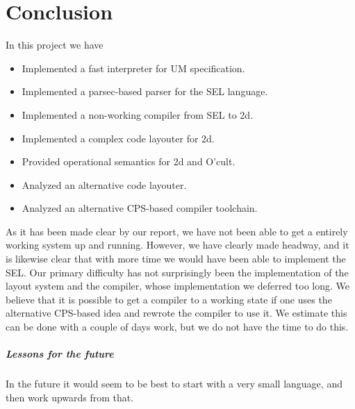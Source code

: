 \chapter*{Conclusion}

In this project we have
\begin{itemize}
\item Implemented a fast interpreter for UM specification.
\item Implemented a parsec-based parser for the SEL language.
\item Implemented a non-working compiler from SEL to 2d.
\item Implemented a complex code layouter for 2d.
\item Provided operational semantics for 2d and O'cult.
\item Analyzed an alternative code layouter.
\item Analyzed an alternative CPS-based compiler toolchain.
\end{itemize}

As it has been made clear by our report, we have not been able to get
a entirely working system up and running. However, we have clearly
made headway, and it is likewise clear that with more time we would
have been able to implement the SEL. Our primary difficulty has not surprisingly been the implementation of the layout system and the
compiler, whose implementation we deferred too long. We believe that
it is possible to get a compiler to a working state if one uses the
alternative CPS-based idea and rewrote the compiler to use it. We
estimate this can be done with a couple of days work, but we do not
have the time to do this.

\paragraph{Lessons for the future}
In the future it would seem to be best to start with a very small
language, and then work upwards from that.

